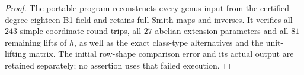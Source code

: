 \begin{proof}
The portable program reconstructs every genus input from the
certified degree-eighteen B1 field and retains full Smith maps
and inverses. It verifies all $243$ simple-coordinate round
trips, all $27$ abelian extension parameters and all $81$
remaining lifts of $h$, as well as the exact class-type
alternatives and the unit-lifting matrix. The initial row-shape
comparison error and its actual output are retained separately;
no assertion uses that failed execution.
\end{proof}
